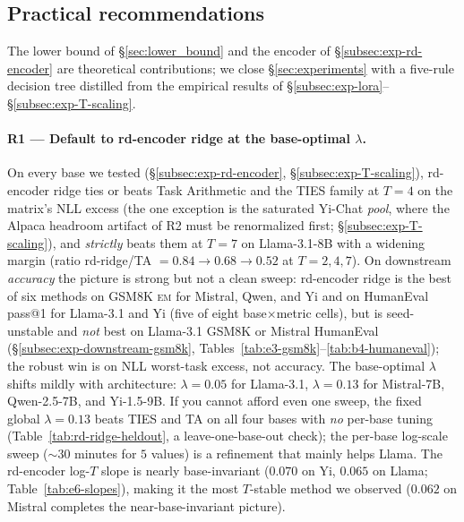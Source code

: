 
\subsection{Practical recommendations}
\label{sec:practical-recommendations}

The lower bound of \S\ref{sec:lower_bound} and the encoder of
\S\ref{subsec:exp-rd-encoder} are theoretical contributions; we close
\S\ref{sec:experiments} with a five-rule decision tree distilled from
the empirical results of \S\ref{subsec:exp-lora}--\S\ref{subsec:exp-T-scaling}.

\paragraph{R1 --- Default to rd-encoder ridge at the base-optimal
$\lambda$.}
On every base we tested (\S\ref{subsec:exp-rd-encoder}, \S\ref{subsec:exp-T-scaling}),
rd-encoder ridge ties or beats Task Arithmetic and the TIES family at
$T = 4$ on the matrix's NLL excess (the one exception is the saturated
Yi-Chat \emph{pool}, where the Alpaca headroom artifact of R2 must be
renormalized first; \S\ref{subsec:exp-T-scaling}), and \emph{strictly}
beats them at $T = 7$ on Llama-3.1-8B with a widening margin (ratio rd-ridge/TA $= 0.84 \to
0.68 \to 0.52$ at $T = 2, 4, 7$). On downstream \emph{accuracy} the picture is strong but not a clean
sweep: rd-encoder ridge is the best of six methods on GSM8K \textsc{em}
for Mistral, Qwen, and Yi and on HumanEval pass@1 for Llama-3.1 and Yi
(five of eight base$\times$metric cells), but is seed-unstable and
\emph{not} best on Llama-3.1 GSM8K or Mistral HumanEval
(\S\ref{subsec:exp-downstream-gsm8k},
Tables~\ref{tab:e3-gsm8k}--\ref{tab:b4-humaneval}); the robust win is
on NLL worst-task excess, not accuracy. The base-optimal $\lambda$ shifts
mildly with architecture: $\lambda = 0.05$ for Llama-3.1, $\lambda =
0.13$ for Mistral-7B, Qwen-2.5-7B, and Yi-1.5-9B. If you cannot afford
even one sweep, the fixed global $\lambda = 0.13$ beats TIES and TA on
all four bases with \emph{no} per-base tuning
(Table~\ref{tab:rd-ridge-heldout}, a leave-one-base-out check); the
per-base log-scale sweep ($\sim 30$ minutes for $5$ values) is a
refinement that mainly helps Llama. The rd-encoder log-$T$ slope is nearly base-invariant
($0.070$ on Yi, $0.065$ on Llama; Table~\ref{tab:e6-slopes}), making
it the most $T$-stable method we observed ($0.062$ on Mistral
completes the near-base-invariant picture).

